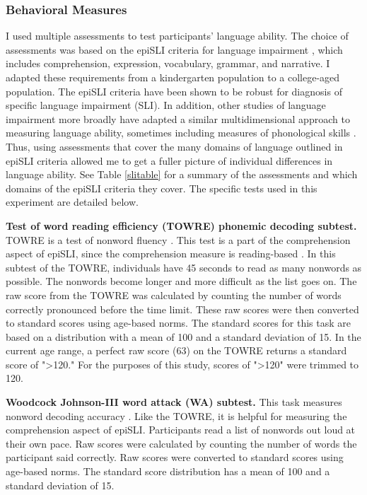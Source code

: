 \documentclass[../dissertation.tex]{subfiles}
\begin{document}
\subsubsection{Behavioral Measures}
	I used multiple assessments to test participants' language ability.  The choice of assessments was based on the epiSLI criteria for language impairment \citep{Tomblin1996}, which includes comprehension, expression, vocabulary, grammar, and narrative. I adapted these requirements from a kindergarten population to a college-aged population. The epiSLI criteria have been shown to be robust for diagnosis of specific language impairment (SLI). In addition, other studies of language impairment more broadly have adapted a similar multidimensional approach to measuring language ability, sometimes including measures of phonological skills \citep{Catts2006}. Thus, using assessments that cover the many domains of language outlined in epiSLI criteria allowed me to get a fuller picture of individual differences in language ability. See Table \ref{slitable} for a summary of the assessments and which domains of the epiSLI criteria they cover. The specific tests used in this experiment are detailed below. \par
	\textbf{Test of word reading efficiency (TOWRE) phonemic decoding subtest.} TOWRE is a test of nonword fluency \citep{Torgesen1992}. This test is a part of the comprehension aspect of epiSLI, since the comprehension measure is reading-based \citep{Gough1986a}. In this subtest of the TOWRE, individuals have 45 seconds to read as many nonwords as possible. The nonwords become longer and more difficult as the list goes on. The raw score from the TOWRE was calculated by counting the number of words correctly pronounced before the time limit. These raw scores were then converted to standard scores using age-based norms. The standard scores for this task are based on a distribution with a mean of 100 and a standard deviation of 15. In the current age range, a perfect raw score (63) on the TOWRE returns a standard score of "\textgreater 120." For the purposes of this study, scores of "\textgreater 120" were trimmed to 120. \par
	\textbf{Woodcock Johnson-III word attack (WA) subtest.} This task measures nonword decoding accuracy \citep{Woodcock2001}. Like the TOWRE, it is helpful for measuring the comprehension aspect of epiSLI. Participants read a list of nonwords out loud at their own pace. Raw scores were calculated by counting the number of words the participant said correctly. Raw scores were converted to standard scores using age-based norms. The standard score distribution has a mean of 100 and a standard deviation of 15. \par
\end{document}
